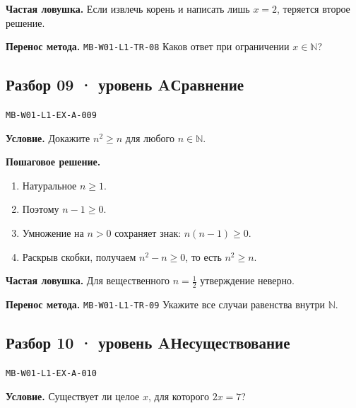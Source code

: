 \documentclass[11pt,a4paper,openany]{book}
\newcommand{\mtag}[1]{\textsf{\small\color{mbaccent}\bfseries #1}}
\newcommand{\muid}[1]{\texttt{\footnotesize #1}}
\begin{document}
\begin{learnbox}\textbf{Частая ловушка.} Если извлечь корень и написать лишь $x=2$, теряется второе решение.\par \textbf{Перенос метода.} \muid{MB-W01-L1-TR-08} Каков ответ при ограничении $x\in\mathbb N$?\end{learnbox}

\subsection*{\mtag{Разбор 09 · уровень A}\quad Сравнение}\hypertarget{MB-W01-L1-EX-A-009}{}

\muid{MB-W01-L1-EX-A-009}\par

\begin{keybox}\textbf{Условие.} Докажите $n^2\ge n$ для любого $n\in\mathbb N$.\end{keybox}

\textbf{Пошаговое решение.}\par
\begin{enumerate}[label=\arabic*),leftmargin=*,itemsep=3pt,topsep=4pt]
\item Натуральное $n\ge1$.
\item Поэтому $n-1\ge0$.
\item Умножение на $n>0$ сохраняет знак: $n(n-1)\ge0$.
\item Раскрыв скобки, получаем $n^2-n\ge0$, то есть $n^2\ge n$.
\end{enumerate}


\begin{learnbox}\textbf{Частая ловушка.} Для вещественного $n=\tfrac12$ утверждение неверно.\par \textbf{Перенос метода.} \muid{MB-W01-L1-TR-09} Укажите все случаи равенства внутри $\mathbb N$.\end{learnbox}

\subsection*{\mtag{Разбор 10 · уровень A}\quad Несуществование}\hypertarget{MB-W01-L1-EX-A-010}{}

\muid{MB-W01-L1-EX-A-010}\par

\begin{keybox}\textbf{Условие.} Существует ли целое $x$, для которого $2x=7$?\end{keybox}
\end{document}
